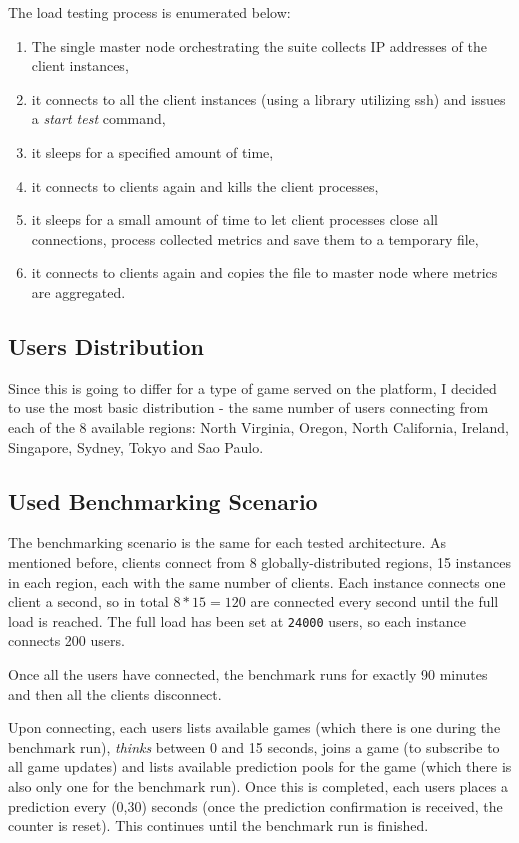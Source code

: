 \documentclass{uvamscse}
\begin{document}
The load testing process is enumerated below:
\begin{enumerate}
  \item The single master node orchestrating the suite collects IP addresses of the client instances,
  \item it connects to all the client instances (using a library utilizing ssh) and issues a \textit{start test} command,
  \item it sleeps for a specified amount of time,
  \item it connects to clients again and kills the client processes,
  \item it sleeps for a small amount of time to let client processes close all connections, process collected metrics and save them to a temporary file,
  \item it connects to clients again and copies the file to master node where metrics are aggregated.
\end{enumerate}

\subsection{Users Distribution}\label{Users Distribution}

Since this is going to differ for a type of game served on the platform, I decided to use the most basic distribution - the same number of users connecting from each of the 8 available regions: North Virginia, Oregon, North California, Ireland, Singapore, Sydney, Tokyo and Sao Paulo.

\subsection{Used Benchmarking Scenario}\label{Used Benchmarking Scenario}

The benchmarking scenario is the same for each tested architecture. As mentioned before, clients connect from 8 globally-distributed regions, 15 instances in each region, each with the same number of clients. Each instance connects one client a second, so in total $8*15=120$ are connected every second until the full load is reached. The full load has been set at \texttt{24000} users, so each instance connects 200 users.

Once all the users have connected, the benchmark runs for exactly 90 minutes and then all the clients disconnect.

Upon connecting, each users lists available games (which there is one during the benchmark run), \textit{thinks} between 0 and 15 seconds, joins a game (to subscribe to all game updates) and lists available prediction pools for the game (which there is also only one for the benchmark run). Once this is completed, each users places a prediction every (0,30) seconds (once the prediction confirmation is received, the counter is reset). This continues until the benchmark run is finished.
\end{document}
